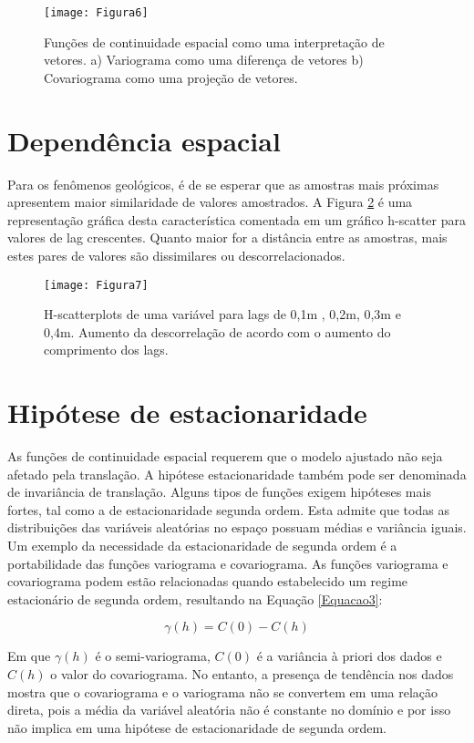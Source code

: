 \begin{figure}[H]
	\centering
	\texttt{[image: Figura6]}
	\caption{Funções de continuidade espacial como uma interpretação de vetores. a) Variograma como uma diferença de vetores b) Covariograma como uma projeção de vetores.}
	\label{Figura6}
\end{figure}

\section{Dependência espacial}

Para os fenômenos geológicos, é de se esperar que as amostras mais próximas apresentem maior similaridade de valores amostrados. A Figura \ref{Figura7} é uma representação gráfica desta característica comentada em um gráfico h-scatter para valores de lag crescentes. Quanto maior for a distância entre as amostras, mais estes pares de valores são dissimilares ou descorrelacionados.  

\begin{figure}[H]
	\centering
	\texttt{[image: Figura7]}
	\caption{H-scatterplots de uma variável para lags de 0,1m , 0,2m, 0,3m e 0,4m. Aumento da descorrelação de acordo com o aumento do comprimento dos lags.}
	\label{Figura7}
\end{figure}

\section{Hipótese de estacionaridade}

As funções de continuidade espacial requerem que o modelo ajustado não seja afetado pela translação. A hipótese estacionaridade também pode ser denominada de invariância de translação. Alguns tipos de funções exigem hipóteses mais fortes, tal como a de estacionaridade segunda ordem. Esta admite que todas as distribuições das variáveis aleatórias no espaço possuam médias e variância iguais. 
Um exemplo da necessidade da estacionaridade de segunda ordem é a portabilidade das funções variograma e covariograma. As funções variograma e covariograma podem estão relacionadas quando estabelecido um regime estacionário de segunda ordem, resultando na Equação \ref{Equacao3}:

\begin{equation}\label{Equacao3}
\gamma(h) = C(0) - C(h)
\end{equation}

Em que $\gamma(h)$ é o semi-variograma, $C(0)$ é a variância à priori dos dados e $C(h)$ o valor do covariograma.  No entanto, a presença de tendência nos dados mostra que o covariograma e o variograma não se convertem em uma relação direta, pois a média da variável aleatória não é constante no domínio e por isso não implica em uma hipótese de estacionaridade de segunda ordem. 

